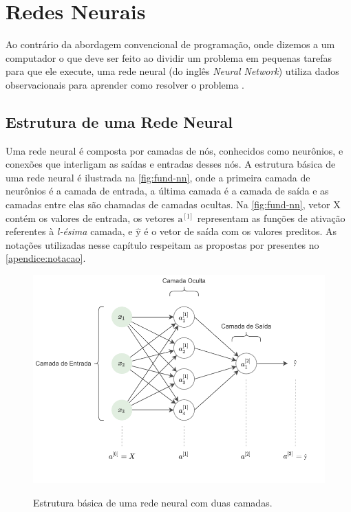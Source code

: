 \section{Redes Neurais} \label{cap:fund-ia-rn}
Ao contrário da abordagem convencional de programação, onde dizemos a um computador o que deve ser feito ao dividir um problema em pequenas tarefas para que ele execute, uma rede neural (do inglês \textit{Neural Network}) utiliza dados observacionais para aprender como resolver o problema \cite{ref:Nielsen}.


\subsection{Estrutura de uma Rede Neural} \label{cap:fund-ia-rn-estrutura}
Uma rede neural é composta por camadas de nós, conhecidos como neurônios, e conexões que interligam as saídas e entradas desses nós. A estrutura básica de uma rede neural é ilustrada na \autoref{fig:fund-nn}, onde a primeira camada de neurônios é a camada de entrada, a última camada é a camada de saída e as camadas entre elas são chamadas de camadas ocultas. Na \autoref{fig:fund-nn}, vetor $\mathrm{X}$ contém os valores de entrada, os vetores $\mathrm{a^{[l]}}$ representam as funções de ativação referentes à \textit{l-ésima} camada, e $\mathrm{\hat{y}}$ é o vetor de saída com os valores preditos. As notações utilizadas nesse capítulo respeitam as propostas por  presentes no \autoref{apendice:notacao}.

\begin{figure}[H] %
  \centering
  \caption{Estrutura básica de uma rede neural com duas camadas.}
  \includegraphics[scale=1.1]{img/img-fundamentacao-nn.pdf}
  \label{fig:fund-nn}
\end{figure}

